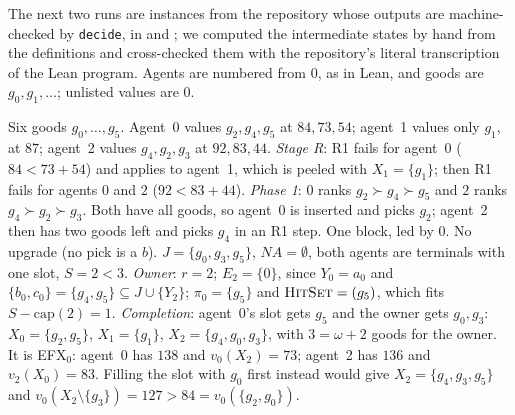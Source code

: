 \documentclass[runningheads,11pt]{llncs}
\newcommand{\efxz}{\texorpdfstring{\mbox{EFX$_0$}}{EFX0}}
\newcommand{\NA}{\mathit{NA}}
\newcommand{\capa}{\mathrm{cap}}
\begin{document}
\medskip
\noindent The next two runs are instances from the repository whose outputs are machine-checked by \texttt{decide}, in  and ; we computed the intermediate states by hand from the definitions and cross-checked them with the repository's literal transcription of the Lean program. Agents are numbered from $0$, as in Lean, and goods are $g_0,g_1,\dots$; unlisted values are $0$.

\begin{example}\label{ex:owner}
Six goods $g_0,\dots,g_5$. Agent~0 values $g_2,g_4,g_5$ at $84,73,54$; agent~1 values only $g_1$, at $87$; agent~2 values $g_4,g_2,g_3$ at $92,83,44$. \emph{Stage R}: R1 fails for agent~0 ($84<73+54$) and applies to agent~1, which is peeled with $X_1=\{g_1\}$; then R1 fails for agents $0$ and $2$ ($92<83+44$). \emph{Phase 1}: $0$ ranks $g_2\succ g_4\succ g_5$ and $2$ ranks $g_4\succ g_2\succ g_3$. Both have all goods, so agent~0 is inserted and picks $g_2$; agent~2 then has two goods left and picks $g_4$ in an R1 step. One block, led by $0$. No upgrade (no pick is a $b$). $J=\{g_0,g_3,g_5\}$, $\NA=\emptyset$, both agents are terminals with one slot, $S=2<3$. \emph{Owner}: $r=2$; $E_2=\{0\}$, since $Y_0=a_0$ and $\{b_0,c_0\}=\{g_4,g_5\}\subseteq J\cup\{Y_2\}$; $\pi_0=\{g_5\}$ and $\textsc{HitSet}=(g_5)$, which fits $S-\capa(2)=1$. \emph{Completion}: agent~0's slot gets $g_5$ and the owner gets $g_0,g_3$: $X_0=\{g_2,g_5\}$, $X_1=\{g_1\}$, $X_2=\{g_4,g_0,g_3\}$, with $3=\omega+2$ goods for the owner. It is \efxz{}: agent~0 has $138$ and $v_0(X_2)=73$; agent~2 has $136$ and $v_2(X_0)=83$. Filling the slot with $g_0$ first instead would give $X_2=\{g_4,g_3,g_5\}$ and $v_0(X_2\setminus\{g_3\})=127>84=v_0(\{g_2,g_0\})$.
\end{example}
\end{document}
